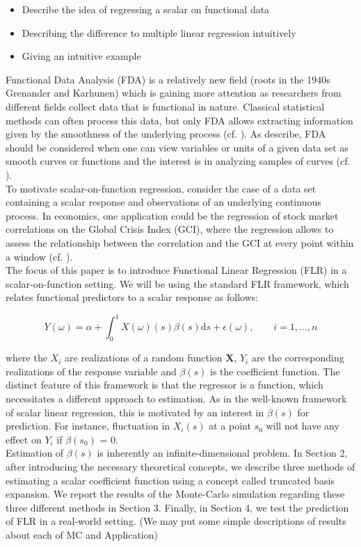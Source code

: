 \documentclass[11pt,twoside,a4paper]{article}
\begin{document}
	\begin{itemize}
		\item Describe the idea of regressing a scalar on functional data
		\item Describing the difference to multiple linear regression intuitively
		\item Giving an intuitive example
	\end{itemize}	
	Functional Data Analysis (FDA) is a relatively new field {\color{red} (roots in the 1940s Grenander and Karhunen)} which is gaining more attention as researchers from different fields collect data that is functional in nature. Classical statistical methods can often process this data, but only FDA allows extracting information given by the smoothness of the underlying process (cf. \cite{levitin_introduction_2007}).
	 As \cite{kokoszka_introduction_2017} describe, FDA should be considered when one can view variables or units of a given data set as smooth curves or functions and the interest is in analyzing samples of curves (cf. \cite[S.~17]{kokoszka_introduction_2017}).\\
	 To motivate scalar-on-function regression, consider the case of a data set containing a scalar response and observations of an underlying continuous process. In economics, one application could be the regression of stock market correlations on the Global Crisis Index (GCI), where the regression allows to assess the relationship between the correlation and the GCI at every point within a window (cf. \cite{Das_2019}).\\
	 The focus of this paper is to introduce Functional Linear Regression (FLR) in a scalar-on-function setting. We will be using the standard FLR framework, which relates functional predictors to a scalar response as follows:
	 
	 \begin{equation}
	 	Y(\omega) = \alpha + \int_{0}^{1}{X(\omega)(s)\beta(s) \mathrm{d}s} + \epsilon(\omega),
	 	\qquad i = 1, ..., n
	 \end{equation}
 
	 where the $X_{i}$ are realizations of a random function $\mathbf{X}$, $Y_i$ are the corresponding realizations of the response variable and $\beta(s)$ is the coefficient function. The distinct feature of this framework is that the regressor is a function, which necessitates a different approach to estimation. As in the well-known framework of scalar linear regression, this is motivated by an interest in $\beta(s)$ for prediction. For instance, fluctuation in $X_i(s)$ at a point $s_0$ will not have any effect on $Y_i$ if $\beta(s_0)$ = 0. \\
	 Estimation of $\beta(s)$ is inherently an infinite-dimensional problem. In Section 2, after introducing the necessary theoretical concepts, we describe three methods of estimating a scalar coefficient function using a concept called truncated basis expansion. We report the results of the Monte-Carlo simulation regarding these three different methods in Section 3. Finally, in Section 4, we test the prediction of FLR in a real-world setting. {\color{red} (We may put some simple descriptions of results about each of MC and Application)}
\end{document}
